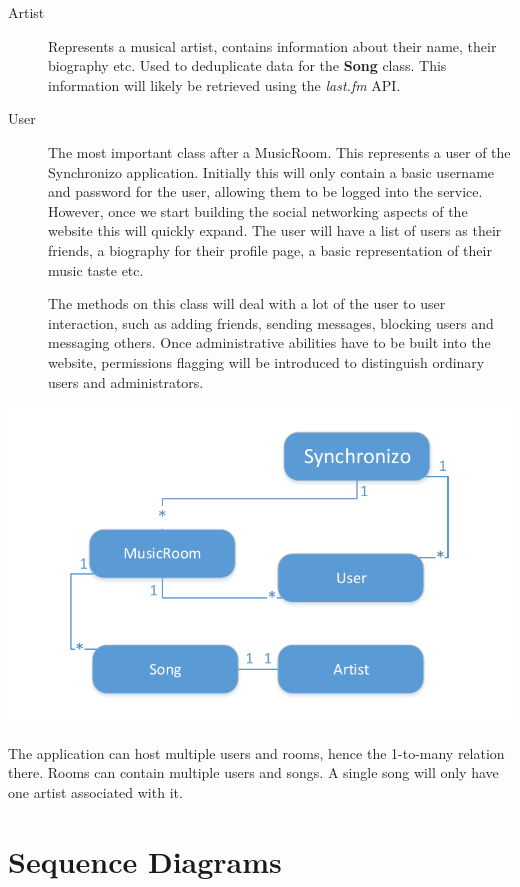 \documentclass[12pt]{report}
\begin{document}
\begin{description}
    \item[Artist] Represents a musical artist, contains information about their name, their biography etc. Used to deduplicate data for the \textbf{Song} class. This information will likely be retrieved using the \textit{last.fm} API.
    
    \item[User] The most important class after a MusicRoom. This represents a user of the Synchronizo application. Initially this will only contain a basic username and password for the user, allowing them to be logged into the service. However, once we start building the social networking aspects of the website this will quickly expand. The user will have a list of users as their friends, a biography for their profile page, a basic representation of their music taste etc.
    
    The methods on this class will deal with a lot of the user to user interaction, such as adding friends, sending messages, blocking users and messaging others. Once administrative abilities have to be built into the website, permissions flagging will be introduced to distinguish ordinary users and administrators.
\end{description}

\includegraphics[scale=0.70]{interactions.pdf}

The application can host multiple users and rooms, hence the 1-to-many relation there. Rooms can contain multiple users and songs. A single song will only have one artist associated with it.

\section{Sequence Diagrams}
\end{document}
